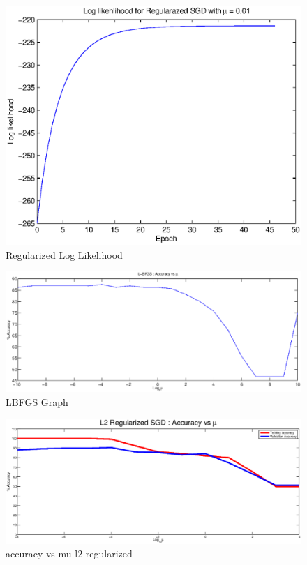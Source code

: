 \documentclass{acm_proc_article-sp}
\begin{document}
\begin{figure}\label{SGD_Regularized_Log_Likelihood}
\centering
\includegraphics[scale=1]{Regularized_Log_Likelihood.eps}
\caption{Regularized Log Likelihood}
\end{figure}

\begin{figure}\label{LBFGS_Graph}
\centering
\includegraphics[scale=0.6]{LBFGS_Graph.eps}
\caption{LBFGS Graph}
\end{figure}

\begin{figure}\label{accuracy_vs_mu_l2_regularized}
\centering
\includegraphics[scale=0.5]{accuracy_vs_mu_l2_regularized.eps}
\caption{accuracy vs mu l2 regularized}
\end{figure}
\end{document}
